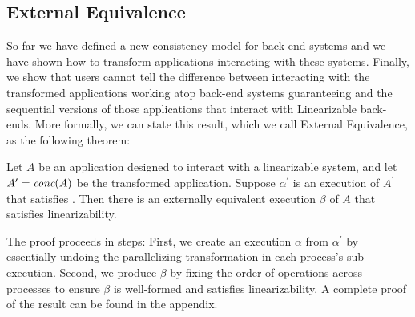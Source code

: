 \subsection{External Equivalence}
\label{sec:mdl:exteq}
So far we have defined a new consistency model for back-end systems and we have shown how to transform applications interacting with these systems. Finally, we show that users cannot tell the difference between interacting with the transformed applications working atop back-end systems guaranteeing \mdl{} and the sequential versions of those applications that interact with Linearizable back-ends. More formally, we can state this result, which we call External Equivalence, as the following theorem:

\begin{thm}
Let $A$ be an application designed to interact with a linearizable system,
and let $A^\prime = \operatorname*{\textit{conc}}(A)$ be the transformed application. Suppose
$\alpha^\prime$ is an execution of $A^\prime$ that satisfies
\MDL{}. Then there is an externally equivalent execution $\beta$
of $A$ that satisfies linearizability.
\end{thm}

The proof proceeds in steps: First, we create an execution $\alpha$ from
$\alpha^\prime$ by essentially undoing the parallelizing transformation in
each process's sub-execution. Second, we produce $\beta$ by fixing the order
of operations across processes to ensure $\beta$ is well-formed and satisfies linearizability. A complete proof of the result can be found in the appendix. 



